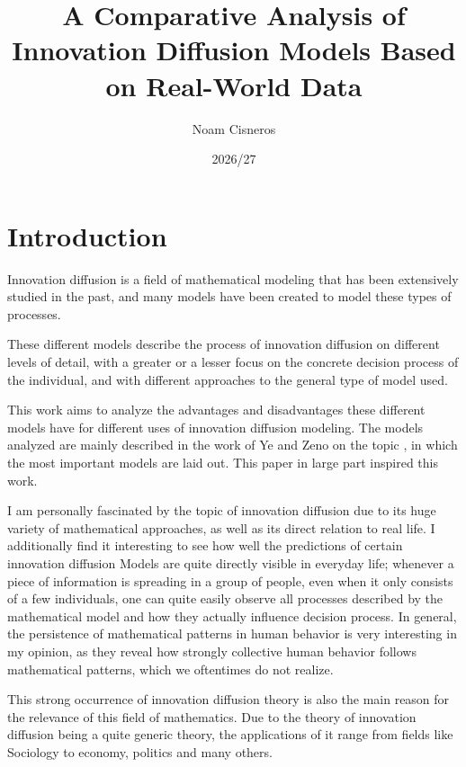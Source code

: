 \documentclass[11pt]{article}
\title{A Comparative Analysis of Innovation Diffusion Models Based on Real-World Data}
\author{Noam Cisneros}
\date{2026/27}
\begin{document}
	
	\maketitle
	\thispagestyle{empty}
	\newpage
	\tableofcontents
	\thispagestyle{empty}
	\newpage
	
	\listoftodos
	
	\section{Introduction}
	Innovation diffusion is a field of mathematical modeling that has been extensively studied in the past, and many models have been created to model these types of processes.
	
	These different models describe the process of innovation diffusion on different levels of detail, with a greater or a lesser focus on the concrete decision process of the individual, and with different approaches to the general type of model used.
	
	This work aims to analyze the advantages and disadvantages these different models have for different uses of innovation diffusion modeling. The models analyzed are mainly described in the work of Ye and Zeno on the topic \autocite{Ye24}, in which the most important models are laid out. This paper in large part inspired this work. 
	
	I am personally fascinated by the topic of innovation diffusion due to its huge variety of mathematical approaches, as well as its direct relation to real life. I additionally find it interesting to see how well the predictions of certain innovation diffusion Models are quite directly visible in everyday life; whenever a piece of information is spreading in a group of people, even when it only consists of a few individuals, one can quite easily observe all processes described by the mathematical model and how they actually influence decision process. In general, the persistence of mathematical patterns in human behavior is very interesting in my opinion, as they reveal how strongly collective human behavior follows mathematical patterns, which we oftentimes do not realize.
	
	This strong occurrence of innovation diffusion theory is also the main reason for the relevance of this field of mathematics. Due to the theory of innovation diffusion being a quite generic theory, the applications of it range from fields like Sociology to economy, politics and many others.
	
\end{document}
